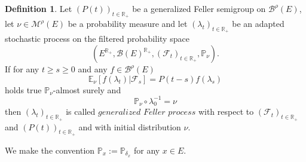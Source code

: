 \documentclass[a4paper,12pt]{article}
\theoremstyle{definition}
\newtheorem{definition}[theorem]{Definition}
\theoremstyle{remark}
\numberwithin{equation}{section}
\numberwithin{theorem}{section}
\begin{document}
\begin{definition} \label{def:generalized Feller process}
Let $\left(P(t)\right)_{t\in\mathbb{R}_{+}}$ be a generalized Feller
semigroup on $\mathcal{\mathscr{B}}^{\rho}(E)$, let $\nu\in\mathcal{M}^{\rho}(E)$
be a probability measure and let $\left(\lambda_{t}\right)_{t\in\mathbb{R}_{+}}$
be an adapted stochastic process on the filtered probability space
\[
\left(E^{\mathbb{R}_{+}},\mathcal{B}(E)^{\mathbb{R}_{+}},\left(\mathcal{F}_{t}\right)_{t\in\mathbb{R}_{+}},\mathbb{P}_{\nu}\right).
\]
If for any $t\geq s\geq0$ and any $f\in\mathcal{\mathscr{B}}^{\rho}(E)$
\begin{equation}
\mathbb{E}_{\nu}\left[\left.f(\lambda_{t})\right|\mathcal{F}_{s}\right]=P\left(t-s\right)f(\lambda_{s})\label{eq:GFS definition conditional expectation}
\end{equation}
holds true $\mathbb{P}_{\nu}$-almost surely and\textcolor{red}{{}
}
\[
\mathbb{P}_{\nu}\circ\lambda_{0}^{-1}=\nu
\]
 then $\left(\lambda_{t}\right)_{t\in\mathbb{R}_{+}}$ is called $\mathit{generalized}$
$\mathit{Feller}$ $\mathit{process}$ with respect to $\left(\mathcal{F}_{t}\right)_{t\in\mathbb{R}_{+}}$
and $\left(P(t)\right)_{t\in\mathbb{R}_{+}}$ and with initial distribution
$\nu$.

We make the convention $\mathbb{P}_{x}:=\mathbb{P}_{\delta_{x}}$ for any
$x\in E$. 
\end{definition}
\end{document}
